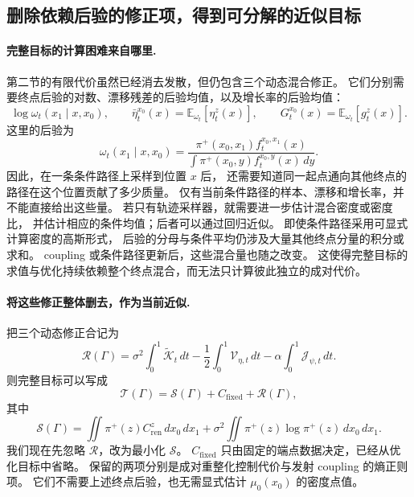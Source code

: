 \documentclass[UTF8,a4paper,11pt,fontset=fandol]{ctexart}
\begin{document}
\clearpage
\subsection*{删除依赖后验的修正项，得到可分解的近似目标}

\paragraph{完整目标的计算困难来自哪里.}
第二节的有限代价虽然已经消去发散，但仍包含三个动态混合修正。
它们分别需要终点后验的对数、漂移残差的后验均值，以及增长率的后验均值：
\begin{equation}
\log\omega_t(x_1\mid x,x_0),\qquad
\bar\eta_t^{x_0}(x)=\mathbb E_{\omega_t}[\eta_t^z(x)],\qquad
G_t^{x_0}(x)=\mathbb E_{\omega_t}[g_t^z(x)].
\label{eq:posterior-dependent-quantities}
\end{equation}
这里的后验为
\begin{equation}
\omega_t(x_1\mid x,x_0)
=\frac{\pi^+(x_0,x_1)f_t^{x_0,x_1}(x)}
{\int\pi^+(x_0,y)f_t^{x_0,y}(x)\,dy}.
\label{eq:posterior-computational-cost}
\end{equation}
因此，在一条条件路径上采样到位置 $x$ 后，
还需要知道同一起点通向其他终点的路径在这个位置贡献了多少质量。
仅有当前条件路径的样本、漂移和增长率，并不能直接给出这些量。
若只有轨迹采样器，就需要进一步估计混合密度或密度比，
并估计相应的条件均值；后者可以通过回归近似。
即使条件路径采用可显式计算密度的高斯形式，
后验的分母与条件平均仍涉及大量其他终点分量的积分或求和。
coupling 或条件路径更新后，这些混合量也随之改变。
这使得完整目标的求值与优化持续依赖整个终点混合，而无法只计算彼此独立的成对代价。

\paragraph{将这些修正整体删去，作为当前近似.}
把三个动态修正合记为
\begin{equation}
\mathcal R(\Gamma)
=\sigma^2\int_0^1\widetilde{\mathcal K}_t\,dt
-\frac12\int_0^1\mathcal V_{\eta,t}\,dt
-\alpha\int_0^1\mathcal J_{\psi,t}\,dt.
\label{eq:collective-remainder}
\end{equation}
则完整目标可以写成
\begin{equation}
\mathcal T(\Gamma)=\mathcal S(\Gamma)+C_{\mathrm{fixed}}+\mathcal R(\Gamma),
\label{eq:surrogate-decomposition}
\end{equation}
其中
\begin{equation}
\boxed{
\mathcal S(\Gamma)
=\iint\pi^+(z)C_{\mathrm{ren}}^z\,dx_0\,dx_1
+\sigma^2\iint\pi^+(z)\log\pi^+(z)\,dx_0\,dx_1.
}
\label{eq:surrogate-objective}
\end{equation}
我们现在先忽略 $\mathcal R$，改为最小化 $\mathcal S$。
$C_{\mathrm{fixed}}$ 只由固定的端点数据决定，已经从优化目标中省略。
保留的两项分别是成对重整化控制代价与发射 coupling 的熵正则项。
它们不需要上述终点后验，也无需显式估计 $\mu_0(x_0)$ 的密度点值。
\end{document}
